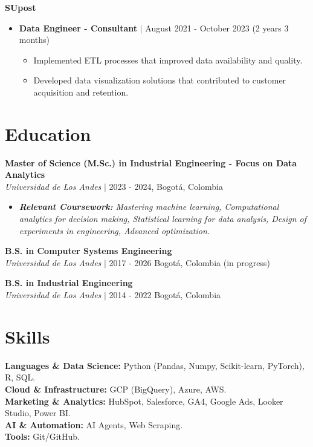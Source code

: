 \documentclass[9pt, letterpaper]{extarticle}
\begin{document}
        \vspace{10pt}

        \noindent \textbf{SUpost}

        \begin{itemize}[leftmargin=15pt, nosep]
            \item \textbf{Data Engineer - Consultant} $\vert$ August 2021 - October 2023 (2 years 3 months)
            \begin{itemize}[leftmargin=15pt, label={--}, nosep]
                \item Implemented ETL processes that improved data availability and quality.
                \item Developed data visualization solutions that contributed to customer acquisition and retention.
            \end{itemize}
        \end{itemize}

    \section*{Education}
        \textbf{Master of Science (M.Sc.) in Industrial Engineering - Focus on Data Analytics} \\
        \textit{Universidad de Los Andes} $\vert$ 2023 - 2024, Bogotá, Colombia
        \begin{itemize}[leftmargin=15pt, nosep]
            \item \textit{\textbf{Relevant Coursework:} Mastering machine learning, Computational analytics for decision making, Statistical learning for data analysis, Design of experiments in engineering, Advanced optimization.}
        \end{itemize}

        \vspace{10pt}

        \textbf{B.S. in Computer Systems Engineering} \\
        \textit{Universidad de Los Andes} $\vert$ 2017 - 2026 Bogotá, Colombia (in progress)

        \vspace{10pt}

        \textbf{B.S. in Industrial Engineering} \\
        \textit{Universidad de Los Andes} $\vert$ 2014 - 2022 Bogotá, Colombia

    \section*{Skills}
        \textbf{Languages \& Data Science:} Python (Pandas, Numpy, Scikit-learn, PyTorch), R, SQL. \\
        \textbf{Cloud \& Infrastructure:} GCP (BigQuery), Azure, AWS. \\
        \textbf{Marketing \& Analytics:} HubSpot, Salesforce, GA4, Google Ads, Looker Studio, Power BI. \\
        \textbf{AI \& Automation:} AI Agents, Web Scraping. \\
        \textbf{Tools:} Git/GitHub.
        
\end{document}
